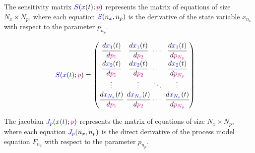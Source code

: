 \documentclass[../Article_Model_Parameters.tex]{subfiles}
\begin{document}
	The sensitivity matrix ${\color{blue}S}({\color{blue}x}(t);{\color{magenta}p})$ represents the matrix of equations of size $N_x \times N_p$, where each equation ${\color{blue}S}(n_x,n_p)$ is the derivative of the state variable $x_{n_x}$ with respect to the parameter $p_{n_p}$.
	
	{\footnotesize
		\begin{equation}
			\begin{split}
				{\color{blue}S}({\color{blue}x}(t);{\color{magenta}p}) & = 
				\begingroup %
				\setlength\arraycolsep{2pt}
				\begin{pmatrix}
					\cfrac{d {\color{blue}x_{1}}(t)}{d {\color{magenta}p_{1}}} 	& \cfrac{d {\color{blue}x_{1}}(t)}{d {\color{magenta}p_{2}}}     & \cdots & \cfrac{d {\color{blue}x_{1}}(t)}{d {\color{magenta}p_{N_p}}}\\
					\cfrac{d {\color{blue}x_{2}}(t)}{d {\color{magenta}p_{1}}} 	& \cfrac{d {\color{blue}x_{2}}(t)}{d {\color{magenta}p_{2}}}     & \cdots & \cfrac{d {\color{blue}x_{2}}(t)}{d {\color{magenta}p_{N_p}}}\\
					\vdots					 	    & \vdots 					   	  & \ddots & \vdots\\
					\cfrac{d {\color{blue}x_{N_x}}(t)}{d {\color{magenta}p_{1}}} 	& \cfrac{d {\color{blue}x_{N_x}}(t)}{d {\color{magenta}p_{2}}}     & \cdots & \cfrac{d {\color{blue}x_{N_x}}(t)}{d {\color{magenta}p_{N_p}}}
				\end{pmatrix} 
				\endgroup
			\end{split}
	\end{equation} }
	
	The jacobian ${\color{blue}J_p}({\color{blue}x}(t);{\color{magenta}p})$ represents the matrix of equations of size $N_x \times N_p$, where each equation ${\color{blue}J_p}(n_x,n_p)$ is the direct derivative of the process model equation $F_{n_x}$ with respect to the parameter $p_{n_p}$.
	
\end{document}
